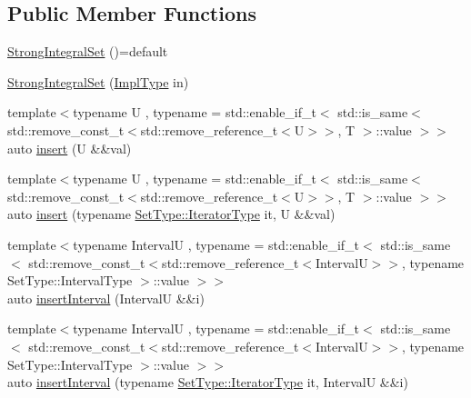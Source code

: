 \subsection*{Public Member Functions}
\begin{DoxyCompactItemize}
\item 
\hyperlink{structvt_1_1term_1_1interval_1_1_strong_integral_set_a1e36b01e6d812ac98b747f72ddc037ff}{Strong\+Integral\+Set} ()=default
\item 
\hyperlink{structvt_1_1term_1_1interval_1_1_strong_integral_set_a3665ee725a96aca390ce60bf04cf3d52}{Strong\+Integral\+Set} (\hyperlink{structvt_1_1term_1_1interval_1_1_strong_integral_set_a19d6007eea0762e5c42e597c4ea92d83}{Impl\+Type} in)
\item 
{\footnotesize template$<$typename U , typename  = std\+::enable\+\_\+if\+\_\+t$<$      std\+::is\+\_\+same$<$        std\+::remove\+\_\+const\+\_\+t$<$std\+::remove\+\_\+reference\+\_\+t$<$\+U$>$$>$, T      $>$\+::value    $>$$>$ }\\auto \hyperlink{structvt_1_1term_1_1interval_1_1_strong_integral_set_acf0af5ef186ca47969641b5ce134a623}{insert} (U \&\&val)
\item 
{\footnotesize template$<$typename U , typename  = std\+::enable\+\_\+if\+\_\+t$<$      std\+::is\+\_\+same$<$        std\+::remove\+\_\+const\+\_\+t$<$std\+::remove\+\_\+reference\+\_\+t$<$\+U$>$$>$, T      $>$\+::value    $>$$>$ }\\auto \hyperlink{structvt_1_1term_1_1interval_1_1_strong_integral_set_a7692cfd426582b6ebd722c6c9a6370ec}{insert} (typename \hyperlink{structvt_1_1term_1_1interval_1_1_integral_set_base_a111b2ec1ea960a40ba4270be702f11f1}{Set\+Type\+::\+Iterator\+Type} it, U \&\&val)
\item 
{\footnotesize template$<$typename IntervalU , typename  = std\+::enable\+\_\+if\+\_\+t$<$      std\+::is\+\_\+same$<$        std\+::remove\+\_\+const\+\_\+t$<$std\+::remove\+\_\+reference\+\_\+t$<$\+Interval\+U$>$$>$,        typename Set\+Type\+::\+Interval\+Type      $>$\+::value    $>$$>$ }\\auto \hyperlink{structvt_1_1term_1_1interval_1_1_strong_integral_set_a8e3f8e02a0daf449d5fc15fccb502b7f}{insert\+Interval} (IntervalU \&\&i)
\item 
{\footnotesize template$<$typename IntervalU , typename  = std\+::enable\+\_\+if\+\_\+t$<$      std\+::is\+\_\+same$<$        std\+::remove\+\_\+const\+\_\+t$<$std\+::remove\+\_\+reference\+\_\+t$<$\+Interval\+U$>$$>$,        typename Set\+Type\+::\+Interval\+Type      $>$\+::value    $>$$>$ }\\auto \hyperlink{structvt_1_1term_1_1interval_1_1_strong_integral_set_a1cee2aeb788162f4458ca2f8ac5ffebb}{insert\+Interval} (typename \hyperlink{structvt_1_1term_1_1interval_1_1_integral_set_base_a111b2ec1ea960a40ba4270be702f11f1}{Set\+Type\+::\+Iterator\+Type} it, IntervalU \&\&i)

\end{DoxyCompactItemize}
